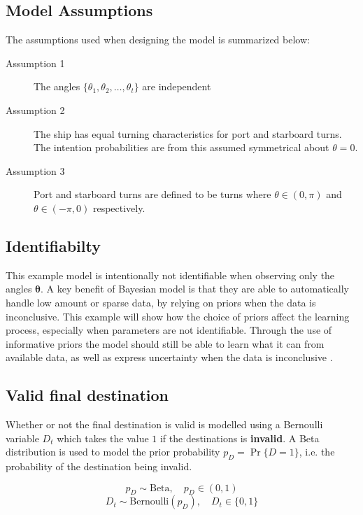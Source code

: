 \subsection{Model Assumptions}
The assumptions used when designing the model is summarized below:
\begin{description}
    \item[Assumption 1] The angles $\{\theta_1, \theta_2, \dots, \theta_t\}$ are independent
    \item[Assumption 2] The ship has equal turning characteristics for port and starboard turns. The intention probabilities are from this assumed symmetrical about $\theta=0$. 
    \item[Assumption 3] Port and starboard turns are defined to be turns where $\theta \in (0, \pi)$ and $\theta \in (-\pi, 0)$ respectively.
\end{description}

\subsection{Identifiabilty}
This example model is intentionally not identifiable when observing only the angles $\boldsymbol{\theta}$. A key benefit of Bayesian model is that they are able to automatically handle low amount or sparse data, by relying on priors when the data is inconclusive. This example will show how the choice of priors affect the learning process, especially when parameters are not identifiable. Through the use of informative priors the model should still be able to learn what it can from available data, as well as express uncertainty when the data is inconclusive .   

\subsection{Valid final destination}
Whether or not the final destination is valid is modelled using a Bernoulli variable $D_t$ which takes the value $1$ if the destinations is \textbf{invalid}. A Beta distribution is used to model the prior probability $p_D = \Pr \{D=1\}$, i.e. the probability of the destination being invalid.  

\begin{equation}
    p_D \sim \text{Beta}, \quad p_D \in (0, 1)
\end{equation}
\begin{equation}
    D_t \sim \text{Bernoulli}(p_D), \quad D_t \in \{0, 1\}
\end{equation}

